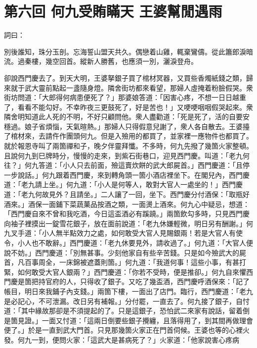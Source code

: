 
\chapter*{第六回 何九受賄瞞天 王婆幫閒遇雨}


詞曰：

\begin{myquote} 
別後誰知，珠分玉剖。忘海誓山盟天共久。偶戀着山雞，輒棄鸞儔。從此簫郎淚暗流。過秦樓，幾空回首。縱新人勝舊，也應須一別，灑淚登舟。

\end{myquote} 

卻說西門慶去了。到天大明，王婆拏銀子買了棺材冥器，又買些香燭紙錢之類，歸來就于武大靈前點起一盞隨身燈。隣舍街坊都來看望，那婦人虛掩着粉臉假哭。衆街坊問道：「大郎得何病患便死了？」那婆娘答道：「因害心疼，不想一日日越重了，看看不能勾好。不幸昨夜三更鼓死了，好是苦也！」又哽哽咽咽假哭起來。衆隣舍明知道此人死的不明，不好只顧問他。衆人盡勸道：「死是死了，活的自要安穩過。娘子省煩惱，天氣暄熱。」那婦人只得假意兒謝了，衆人各自散去。王婆擡了棺材來，去請仵作團頭何九。但是入殮用的都買了，並家裡一應物件也都買了。就於報恩寺叫了兩箇禪和子，晚夕伴靈拜懺。不多時，何九先撥了幾箇火家整頓。且說何九到巳牌時分，慢慢的走來，到紫石街巷口，迎見西門慶。叫道：「老九何往？」何九答道：「小人只去前面，殮這賣炊餅的武大郎屍首。」西門慶道：「且停一步說話。」何九跟着西門慶，來到轉角頭一箇小酒店裡坐下。在閣兒內，西門慶道：「老九請上坐。」何九道：「小人是何等人，敢對大官人一處坐的！」西門慶道：「老九何故見外？且請坐。」二人讓了一回，坐下。西門慶分付酒保：「取瓶好酒來。」酒保一面鋪下菜蔬菓品按酒之類，一面燙上酒來。何九心中疑忌，想道：「西門慶自來不曾和我吃酒，今日這盃酒必有蹊蹺。」兩箇飲勾多時，只見西門慶向袖子裡摸出一錠雪花銀子，放在面前說道：「老九休嫌輕微，明日另有酬謝。」何九叉手道：「小人無半點效力之處，如何敢受大官人見賜銀兩！若是大官人有使令，小人也不敢辭。」西門慶道：「老九休要見外，請收過了。」何九道：「大官人便說不妨。」西門慶道：「別無甚事。少刻他家自有些辛苦錢。只是如今殮武大的屍首，凡百事周全，一床錦被遮蓋則箇。」何九道：「我道何事！這些小事，有甚打緊，如何敢受大官人銀兩？」西門慶道：「你若不受時，便是推卻。」何九自來懼西門慶是箇把持官府的人，只得收了銀子。又吃了幾盃酒，西門慶呼酒保來：「記了帳目，明日來我鋪子內支錢。」兩箇下樓，一面出了店門。臨行，西門慶道：「老九是必記心，不可泄漏。改日另有補報。」{}分付罷，一直去了。何九接了銀子，自忖道：「其中緣故那卻是不須提起的了。只是這銀子，恐怕武二來家有說話，留着倒是箇見證。」一面又忖道：「這兩日倒要些銀子攪纏，且落得用了，到其間再做理會便了。」於是一直到武大門首。只見那幾箇火家正在門首伺候。王婆也等的心裡火發。何九一到，便問火家：「這武大是甚病死了？」火家道：「他家說害心疼病